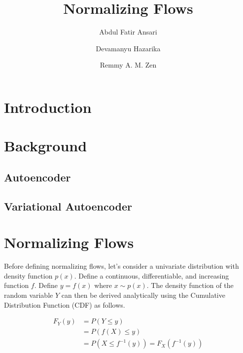 \documentclass[runningheads]{llncs}
\begin{document}
%
\title{Normalizing Flows}
%
%
\author{Abdul Fatir Ansari \and
Devamanyu Hazarika\and
Remmy A. M. Zen}
%
%
%
\maketitle              %
%
\begin{abstract}


\end{abstract}
%
%
%
\section{Introduction}
\section{Background}
\subsection{Autoencoder}
\subsection{Variational Autoencoder}


\section{Normalizing Flows}

Before defining normalizing flows, let's consider a univariate distribution with density function $p(x)$. Define a continuous, differentiable, and increasing function $f$. Define $y = f(x)$ where $x \sim p(x)$. The density function of the random variable $Y$ can then be derived analytically using the Cumulative Distribution Function (CDF) as follows.

\begin{align}
F_{Y}(y) &= P(Y \leq y)\\
&= P(f(X) \leq y)\\
&= P(X \leq f^{-1}(y)) = F_{X}( f^{-1}(y))
\end{align}
\end{document}
